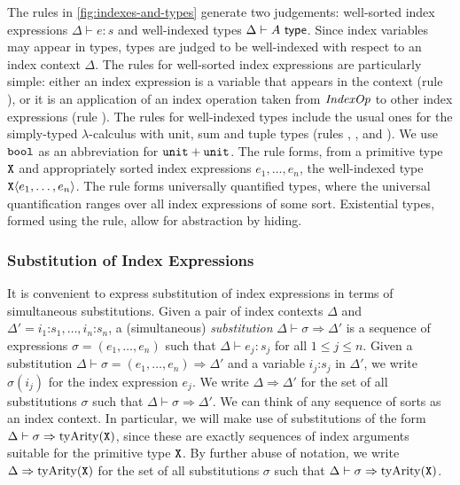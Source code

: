 The rules in \autoref{fig:indexes-and-types}
generate two judgements: well-sorted index expressions $\Delta \vdash
e : s$ and well-indexed types $\Delta \vdash A \textup{\textsf{ type}}$. Since index
variables may appear in types, types are judged to be well-indexed
with respect to an index context $\Delta$. The rules for well-sorted
index expressions are particularly simple: either an index expression
is a variable that appears in the context (rule ), or it
is an application of an index operation taken from $\mathit{IndexOp}$ to
other index expressions (rule ). 
The rules for well-indexed types include the usual ones
for
the simply-typed $\lambda$-calculus with unit, sum and tuple types
(rules , ,  and
). 
We use $\textup{\texttt{bool}}$ as an abbreviation for $\textup{\texttt{unit}} + \textup{\texttt{unit}}$.
The rule  %
forms, from a primitive type $\textup{\texttt{X}}$ and appropriately sorted
index expressions $e_1,\ldots,e_n$, the well-indexed type
$\textup{\texttt{X}}\langle e_1,\ldots,e_n \rangle$. The rule  
forms universally quantified types, where the universal
quantification ranges over all index expressions of some
sort. Existential types, %
formed using the  rule,
allow for abstraction by hiding. %

\subsubsection{Substitution of Index Expressions}
\label{sec:simultaneous-substitution}

It %
is convenient to express substitution of index
expressions %
in terms of simultaneous substitutions.
Given a pair of index contexts $\Delta$ and $\Delta' = i_1 \mathord:
s_1, \ldots, i_n \mathord: s_n$, a (simultaneous) \emph{substitution}
$\Delta \vdash \sigma \Rightarrow \Delta'$ is a sequence of
expressions $\sigma = (e_1,\ldots,e_n)$ such that $\Delta \vdash e_j :
s_j$ for all $1 \leq j \leq n$. Given a substitution
$\Delta \vdash \sigma = (e_1,\ldots,e_n) \Rightarrow \Delta'$ and a
variable $i_j \mathord: s_j$ in $\Delta'$, we write $\sigma(i_j)$ for
the index expression $e_j$. We write $\Delta \Rightarrow \Delta'$ for
the set of all substitutions $\sigma$ such that $\Delta
\vdash \sigma \Rightarrow \Delta'$.
%
We can think of any sequence of sorts as an index
context. In particular, we will make use of substitutions
of the form $\Delta \vdash \sigma \Rightarrow
\mathrm{tyArity}(\textup{\texttt{X}})$, since these are exactly sequences of
index arguments suitable for the primitive type $\textup{\texttt{X}}$. By
further abuse of notation, we write $\Delta \Rightarrow
\mathrm{tyArity}(\textup{\texttt{X}})$ for the set of all 
substitutions $\sigma$ such that $\Delta \vdash \sigma \Rightarrow
\mathrm{tyArity}(\textup{\texttt{X}})$.

